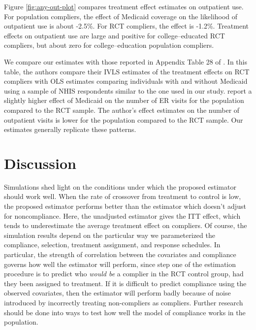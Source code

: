 \documentclass[12pt]{article}
\begin{document}
Figure \ref{fig:any-out-plot} compares treatment effect estimates on outpatient use. For population compliers, the effect of Medicaid coverage on the likelihood of outpatient use is about -2.5\%. For RCT compliers, the effect is -1.2\%. Treatment effects on outpatient use are large and positive for college--educated RCT compliers, but about zero for college--education population compliers. 



We compare our estimates with those reported in Appendix Table 28 of \citet{finkelstein2012}. In this table, the authors compare their IVLS estimates of the treatment effects on RCT compliers with OLS estimates comparing individuals with and without Medicaid using a sample of NHIS respondents similar to the one used in our study. \citet{finkelstein2012} report a slightly higher effect of Medicaid on the number of ER visits for the population compared to the RCT sample. The author's effect estimates on the number of outpatient visits is lower for the population compared to the RCT sample. Our estimates generally replicate these patterns. 

\section{Discussion}

Simulations shed light on the conditions under which the proposed estimator should work well.  When the rate of crossover from treatment to control is low, the proposed estimator performs better than the estimator which doesn't adjust for noncompliance.  Here, the unadjusted estimator gives the ITT effect, which tends to underestimate the average treatment effect on compliers. Of course, the simulation results depend on the particular way we parameterized the compliance, selection, treatment assignment, and response schedules.  In particular, the strength of correlation between the covariates and compliance governs how well the estimator will perform, since step one of the estimation procedure is to predict who \textit{would be} a complier in the RCT control group, had they been assigned to treatment. If it is difficult to predict compliance using the observed covariates, then the estimator will perform badly because of noise introduced by incorrectly treating non-compliers as compliers.  Further research should be done into ways to test how well the model of compliance works in the population. 
\end{document}
